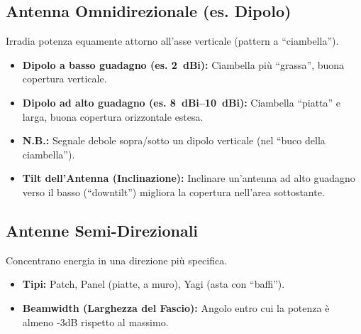 \documentclass{article}
\begin{document}
\subsection{Antenna Omnidirezionale (es. Dipolo)}
Irradia potenza equamente attorno all'asse verticale (pattern a ``ciambella'').
\begin{itemize}
    \item \textbf{Dipolo a basso guadagno (es. \SI{2}{dBi}):} Ciambella più ``grassa'', buona copertura verticale.
    \item \textbf{Dipolo ad alto guadagno (es. \SIrange{8}{10}{dBi}):} Ciambella ``piatta'' e larga, buona copertura orizzontale estesa.
    \item \textbf{N.B.:} Segnale debole sopra/sotto un dipolo verticale (nel ``buco della ciambella'').
    \item \textbf{Tilt dell'Antenna (Inclinazione):} Inclinare un'antenna ad alto guadagno verso il basso (``downtilt'') migliora la copertura nell'area sottostante.
\end{itemize}
\begin{center}
\end{center}

\subsection{Antenne Semi-Direzionali}
Concentrano energia in una direzione più specifica.
\begin{itemize}
    \item \textbf{Tipi:} Patch, Panel (piatte, a muro), Yagi (asta con ``baffi'').
    \item \textbf{Beamwidth (Larghezza del Fascio):} Angolo entro cui la potenza è almeno -3dB rispetto al massimo.
\end{itemize}
\end{document}
